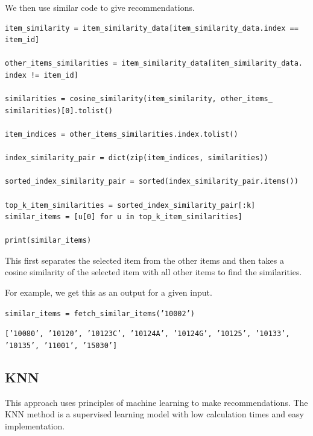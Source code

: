 \documentclass{article}
\begin{document}
We then use similar code to give recommendations.

\begin{lstlisting}
item_similarity = item_similarity_data[item_similarity_data.index == item_id]

other_items_similarities = item_similarity_data[item_similarity_data.
index != item_id]

similarities = cosine_similarity(item_similarity, other_items_
similarities)[0].tolist()

item_indices = other_items_similarities.index.tolist()

index_similarity_pair = dict(zip(item_indices, similarities))

sorted_index_similarity_pair = sorted(index_similarity_pair.items())

top_k_item_similarities = sorted_index_similarity_pair[:k]
similar_items = [u[0] for u in top_k_item_similarities]

print(similar_items)
\end{lstlisting}

This first separates the selected item from the other items and then takes a cosine similarity of the selected item with all other items to find the similarities.

For example, we get this as an output for a given input.

\begin{center}
    \texttt{similar\_items = fetch\_similar\_items('10002')}

    \texttt{['10080', '10120', '10123C', '10124A', '10124G', '10125', '10133', '10135', '11001', '15030']}
\end{center}

\subsection{KNN}

This approach uses principles of machine learning to make recommendations. The KNN method is a supervised learning model with low calculation times and easy implementation.
\end{document}

